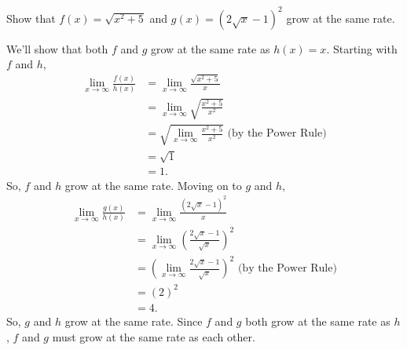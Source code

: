 \begin{example}
	Show that $f(x)=\sqrt{x^2+5}$ and $g(x)=\left(2\sqrt{x}-1\right)^2$ grow at the same rate.
\end{example}
We'll show that both $f$ and $g$ grow at the same rate as $h(x)=x$.
Starting with $f$ and $h$,
\begin{align*}
	\lim_{x\to\infty}{\frac{f(x)}{h(x)}} &= \lim_{x\to\infty}{\frac{\sqrt{x^2+5}}{x}} \\
	&= \lim_{x\to\infty}{\sqrt{\frac{x^2+5}{x^2}}} \\
	&= \sqrt{\lim_{x\to\infty}{\frac{x^2+5}{x^2}}} \text{ (by the Power Rule)} \\
	&= \sqrt{1} \\
	&= 1.
\end{align*}
\indent
So, $f$ and $h$ grow at the same rate.
Moving on to $g$ and $h$,
\begin{align*}
	\lim_{x\to\infty}{\frac{g(x)}{h(x)}} &= \lim_{x\to\infty}{\frac{\left(2\sqrt{x}-1\right)^2}{x}} \\
	&= \lim_{x\to\infty}{\left(\frac{2\sqrt{x}-1}{\sqrt{x}}\right)^2} \\
	&= \left(\lim_{x\to\infty}{\frac{2\sqrt{x}-1}{\sqrt{x}}}\right)^2 \text{ (by the Power Rule)} \\
	&= \left(2\right)^2 \\
	&= 4.
\end{align*}
\indent
So, $g$ and $h$ grow at the same rate.
Since $f$ and $g$ both grow at the same rate as $h$, $f$ and $g$ must grow at the same rate as each other.

